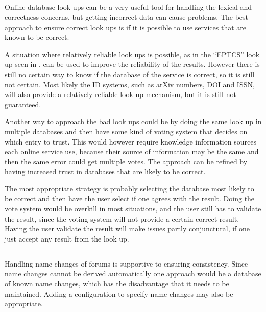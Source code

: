 \subsection{}
\label{sec:approach_look_ups}

Online database look ups can be a very useful tool for handling the
lexical and correctness concerns, but getting incorrect data can cause
problems.  The best approach to ensure correct look ups is if it is
possible to use services that are known to be correct.

A situation where relatively reliable look ups is possible, as in the
``EPTCS'' look up seen in , can be used to
improve the reliability of the results.  However there is still no
certain way to know if the database of the service is correct, so it
is still not certain.  Most likely the ID systems, such as arXiv
numbers, DOI and ISSN, will also provide a relatively reliable look up
mechanism, but it is still not guaranteed.

Another way to approach the bad look ups could be by doing the same
look up in multiple databases and then have some kind of voting system
that decides on which entry to trust.  This would however require
knowledge information sources each online service use, because their
source of information may be the same and then the same error could
get multiple votes.  The approach can be refined by having increased
trust in databases that are likely to be correct.

The most appropriate strategy is probably selecting the database most
likely to be correct and then have the user select if one agrees with
the result.  Doing the vote system would be overkill in most
situations, and the user still has to validate the result, since the
voting system will not provide a certain correct result.  Having the
user validate the result will make issues partly conjunctural, if one
just accept any result from the look up.


\subsection{}

Handling name changes of forums is supportive to ensuring consistency.
Since name changes cannot be derived automatically one approach would
be a database of known name changes, which has the disadvantage that
it needs to be maintained.  Adding a configuration to specify name
changes may also be appropriate.


